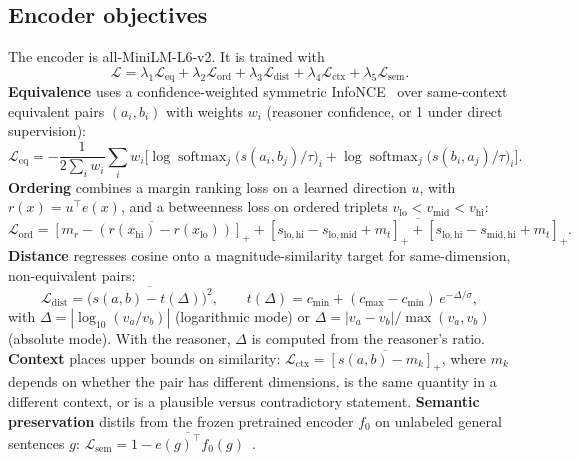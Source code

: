 \documentclass[11pt]{article}
\newcommand{\Lq}{\mathcal{L}}
\newcommand{\sem}{\mathrm{sem}}
\begin{document}
\subsection{Encoder objectives}
The encoder is all-MiniLM-L6-v2. It is trained with
\begin{equation}
\Lq = \lambda_1\Lq_{\mathrm{eq}} + \lambda_2\Lq_{\mathrm{ord}} + \lambda_3\Lq_{\mathrm{dist}} + \lambda_4\Lq_{\mathrm{ctx}} + \lambda_5\Lq_{\sem}.
\end{equation}
\textbf{Equivalence} uses a confidence-weighted symmetric InfoNCE~\cite{oord2018cpc} over same-context equivalent pairs
$(a_i,b_i)$ with weights $w_i$ (reasoner confidence, or 1 under direct supervision):
\begin{equation}
\Lq_{\mathrm{eq}} = -\frac{1}{2\sum_i w_i}\sum_i w_i\Big[\log\operatorname{softmax}_j\big(s(a_i,b_j)/\tau\big)_i + \log\operatorname{softmax}_j\big(s(b_i,a_j)/\tau\big)_i\Big].
\end{equation}
\textbf{Ordering} combines a margin ranking loss on a learned direction $u$, with $r(x)=u^\top e(x)$, and a betweenness
loss on ordered triplets $v_{\mathrm{lo}}<v_{\mathrm{mid}}<v_{\mathrm{hi}}$:
\begin{equation}
\Lq_{\mathrm{ord}} = \overline{[m_r-(r(x_{\mathrm{hi}})-r(x_{\mathrm{lo}}))]_+} + \overline{[s_{\mathrm{lo,hi}}-s_{\mathrm{lo,mid}}+m_t]_+ + [s_{\mathrm{lo,hi}}-s_{\mathrm{mid,hi}}+m_t]_+}.
\end{equation}
\textbf{Distance} regresses cosine onto a magnitude-similarity target for same-dimension, non-equivalent pairs:
\begin{equation}
\Lq_{\mathrm{dist}} = \overline{\big(s(a,b)-t(\Delta)\big)^2},\qquad t(\Delta)=c_{\min}+(c_{\max}-c_{\min})\,e^{-\Delta/\sigma},
\end{equation}
with $\Delta=|\log_{10}(v_a/v_b)|$ (logarithmic mode) or $\Delta=|v_a-v_b|/\max(v_a,v_b)$ (absolute mode). With the
reasoner, $\Delta$ is computed from the reasoner's ratio. \textbf{Context} places upper bounds on similarity:
$\Lq_{\mathrm{ctx}}=\overline{[s(a,b)-m_k]_+}$, where $m_k$ depends on whether the pair has different dimensions, is the
same quantity in a different context, or is a plausible versus contradictory statement. \textbf{Semantic preservation}
distils from the frozen pretrained encoder $f_0$ on unlabeled general sentences $g$:
$\Lq_{\sem}=\overline{1-e(g)^\top f_0(g)}$~\cite{reimers2020multilingual}.
\end{document}
